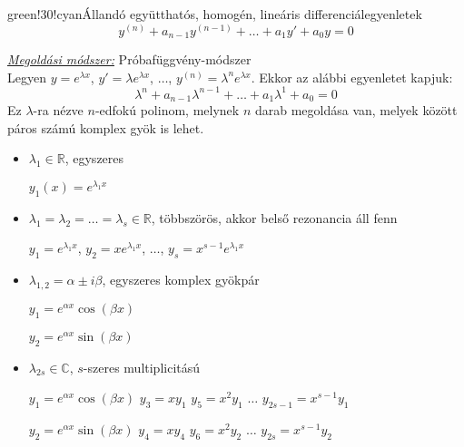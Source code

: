 \documentclass[main.tex]{subfiles}
\begin{document}
\begin{cbox}{green!30!cyan}{Állandó együtthatós, homogén, lineáris differenciálegyenletek}
  \[
    y^{(n)}
    + a_{n-1} y^{(n-1)}
    + \dots
    + a_1 y'
    + a_0 y
    = 0
  \]

  \emph{\underline{Megoldási módszer:}} \quad Próbafüggvény-módszer
  \\[2mm]
  Legyen $y = e^{\lambda x}$, $y' = \lambda e^{\lambda x}$,
  $\dots$, $y^{(n)} = \lambda^n e^{\lambda x}$. Ekkor az
  alábbi egyenletet kapjuk:
  \[
    \lambda^n
    + a_{n-1} \lambda^{n-1}
    + \dots
    + a_{1} \lambda^{1}
    + a_{0}
    = 0
  \]
  Ez $\lambda$-ra nézve $n$-edfokú polinom, melynek
  $n$ darab megoldása van, melyek között páros számú
  komplex gyök is lehet.
  \begin{itemize}
    \item $\lambda_1 \in \mathbb{R}$, egyszeres

          $y_1(x) = e^{\lambda_1 x}$

    \item $\lambda_1 = \lambda_2 = \dots = \lambda_s \in \mathbb{R}$,
          többszörös, akkor belső rezonancia áll fenn

          $y_1 = e^{\lambda_1 x}$,
          $y_2 = x e^{\lambda_1 x}$,
          $\dots$,
          $y_s = x^{s-1} e^{\lambda_1 x}$

    \item $\lambda_{1,2} = \alpha \pm i\beta$, egyszeres komplex gyökpár

          $y_1 = e^{\alpha x} \cos (\beta x)$

          $y_2 = e^{\alpha x} \sin (\beta x)$

    \item $\lambda_{2s} \in \mathbb{C}$, $s$-szeres multiplicitású

          $y_1 = e^{\alpha x} \cos (\beta x)$
          \tabto{4cm}
          $y_3 = x y_1$
          \tabto{7cm}
          $y_5 = x^2 y_1$
          \tabto{10cm}
          $\dots$
          \tabto{11.5cm}
          $y_{2s-1} = x^{s-1} y_1$

          $y_2 = e^{\alpha x} \sin (\beta x)$
          \tabto{4cm}
          $y_4 = x y_4$
          \tabto{7cm}
          $y_6 = x^2 y_2$
          \tabto{10cm}
          $\dots$
          \tabto{11.5cm}
          $y_{2s} = x^{s-1} y_2$
  \end{itemize}
\end{cbox}
\end{document}
